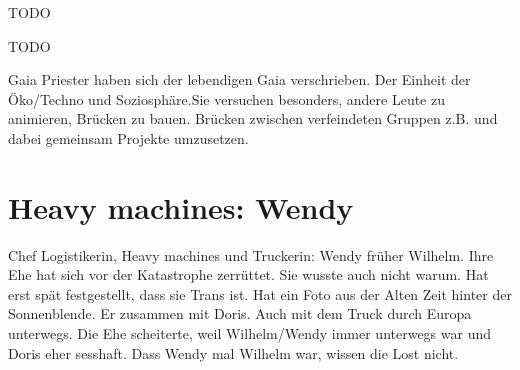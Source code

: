 \begin{npcBox}[title=Laura, Gaianistin]
    \begin{stunts}
    \item {}
    \end{stunts}

    \begin{stressSection}
    \end{stressSection}
    \begin{tabularx}{\textwidth}{ XX }
    \end{tabularx}

    \begin{consequences}
    \item {}
    \item {}
    \item {}
    \end{consequences}

    \begin{npcDescription}
    TODO
    \end{npcDescription}


    \begin{equipment}
    \item TODO
    \end{equipment}
\end{npcBox}


Gaia Priester haben sich der lebendigen Gaia verschrieben. Der Einheit der Öko/Techno und Soziosphäre.Sie versuchen besonders, andere Leute zu animieren,  Brücken zu bauen. Brücken zwischen verfeindeten Gruppen z.B. und dabei gemeinsam Projekte umzusetzen.

\newpage


\section{Heavy machines: Wendy}

Chef Logistikerin, Heavy machines und Truckerin: Wendy früher Wilhelm. Ihre Ehe hat sich vor der Katastrophe zerrüttet. Sie wusste auch nicht warum. Hat erst spät festgestellt, dass sie Trans ist. Hat ein Foto aus der Alten Zeit hinter der Sonnenblende. Er zusammen mit Doris. Auch mit dem Truck durch Europa unterwegs. Die Ehe scheiterte, weil Wilhelm/Wendy immer unterwegs war und Doris eher sesshaft. Dass Wendy mal Wilhelm war, wissen die Lost nicht.

